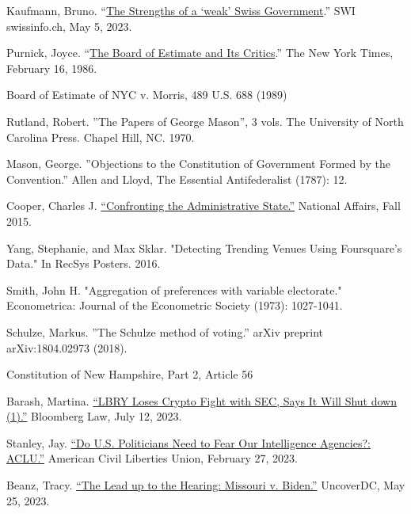 \documentclass{article}
\begin{document}
\begin{thebibliography}{20}
Kaufmann, Bruno. “\href{https://www.swissinfo.ch/eng/business/the-strengths-of-a--weak--swiss-government/48483858. }{The Strengths of a ‘weak’ Swiss Government}.” SWI swissinfo.ch, May 5, 2023. 

Purnick, Joyce. “\href{https://www.nytimes.com/1986/02/16/weekinreview/the-board-of-estimate-and-its-critics.html}{The Board of Estimate and Its Critics}.” The New York Times, February 16, 1986.

Board of Estimate of NYC v. Morris, 489 U.S. 688 (1989)

Rutland, Robert. ”The Papers of George Mason”, 3 vols. The University of North Carolina Press. Chapel Hill, NC. 1970.

Mason, George. ”Objections to the Constitution of Government Formed by the Convention.” Allen and Lloyd, The Essential Antifederalist (1787): 12.

Cooper, Charles J. \href{https://www.nationalaffairs.com/publications/detail/confronting-the-administrative-state}{“Confronting the Administrative State.”} National Affairs, Fall 2015.

Yang, Stephanie, and Max Sklar. "Detecting Trending Venues Using Foursquare's Data." In RecSys Posters. 2016.

Smith, John H. "Aggregation of preferences with variable electorate." Econometrica: Journal of the Econometric Society (1973): 1027-1041.

Schulze, Markus. ”The Schulze method of voting.” arXiv preprint arXiv:1804.02973 (2018).

Constitution of New Hampshire, Part 2, Article 56

Barash, Martina. \href{https://news.bloomberglaw.com/ip-law/lbry-loses-crypto-token-fight-with-sec-but-vows-it-wont-appeal}{“LBRY Loses Crypto Fight with SEC, Says It Will Shut down (1).”} Bloomberg Law, July 12, 2023.

Stanley, Jay. \href{https://www.aclu.org/news/national-security/do-us-politicians-need-fear-our-intelligence}{“Do U.S. Politicians Need to Fear Our Intelligence Agencies?: ACLU.”} American Civil Liberties Union, February 27, 2023.

Beanz, Tracy. \href{https://www.uncoverdc.com/2023/05/24/the-lead-up-to-the-hearing-missouri-v-biden/}{“The Lead up to the Hearing: Missouri v. Biden.”} UncoverDC, May 25, 2023. 


\end{thebibliography}
\end{document}
